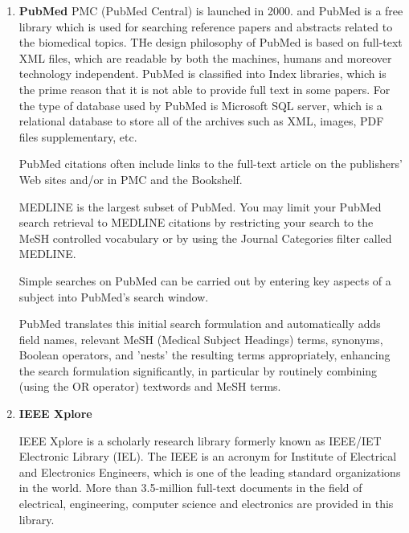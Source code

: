 \begin{enumerate}
	
	\item\textbf{PubMed}
	\setlength{\parindent}{1em}
	 PMC (PubMed Central) is launched in 2000.	
	 and PubMed is a free library which is used for searching reference papers and abstracts related to the biomedical topics.
	 THe design philosophy of PubMed is based on full-text XML files, which are readable by both the machines, humans and moreover technology independent.
	 PubMed is classified into Index libraries, which is the prime reason that it is not able to provide full text in some papers.
	 For the type of database used by PubMed is Microsoft SQL server, which is a relational database to store all of 
	 the archives such as XML, images, PDF files supplementary, etc. 
	 
	 PubMed citations often include links to the full-text article on the publishers' Web sites and/or in PMC and the Bookshelf. 
	 
	 MEDLINE is the largest subset of PubMed. You may limit your PubMed search retrieval to MEDLINE citations by restricting your search to the MeSH
	 controlled vocabulary or by using the Journal Categories filter called MEDLINE.

     Simple searches on PubMed can be carried out by entering key aspects of a subject into PubMed's search window.

     PubMed translates this initial search formulation and automatically adds field names, relevant MeSH (Medical Subject Headings) terms, synonyms, Boolean operators, 
     and 'nests' the resulting terms appropriately, enhancing the search formulation significantly, in particular by routinely
     combining (using the OR operator) textwords and MeSH terms.
		
	\item\textbf{IEEE Xplore}
	\setlength{\parindent}{1em}
	
	IEEE Xplore is a scholarly research library formerly known as IEEE/IET Electronic Library (IEL).
	The IEEE is an acronym for Institute of Electrical and Electronics Engineers, which is one of the leading standard organizations in the world.
	More than 3.5-million full-text documents in the field of electrical, engineering, computer science and electronics are provided in this library. 
	

\end{enumerate}
